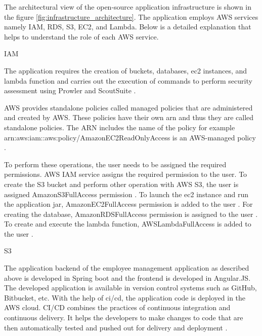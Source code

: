 \par The architectural view of the open-source
application infrastructure is shown in the figure
\ref{fig:infrastructure_architecture}.
The application employs AWS services namely IAM, RDS, S3, EC2, and Lambda.
Below is a detailed explanation that helps to understand the role of each AWS service.

\par IAM

\par The application requires the creation of buckets, databases, ec2 instances, and lambda function and carries out the
execution of commands to perform security assessment
using Prowler and ScoutSuite \cite{79}.

\par AWS provides standalone policies called managed
policies that are administered and created by AWS. These
policies have their own  \gls{arn} and thus they are called
standalone policies.
The ARN includes the name of the policy for example
arn:aws:iam::aws:policy/AmazonEC2ReadOnlyAccess is an AWS-managed policy \cite{80}.

\par To perform these operations, the user needs to be assigned the required permissions.
AWS IAM service assigns the required permission to the user.
To create the S3 bucket and perform other operation with AWS S3, the user is assigned AmazonS3FullAccess permission \cite{81}.
To launch the ec2 instance and run the application jar, AmazonEC2FullAccess permission is added to the user \cite{82}.
For creating the database, AmazonRDSFullAccess permission is assigned to the user \cite{83}.
To create and execute the lambda function, AWSLambdaFullAccess is added to the user \cite{84}.
\hfill \break



\hfill \break

\par S3

\par The application backend of the employee management application as described above is developed in Spring boot and the frontend is developed in Angular.JS. The developed application is available in version control systems such as GitHub, Bitbucket, etc.
With the help of \gls{ci}/\gls{cd}, the application code is
deployed
in the AWS cloud.
CI/CD combines the practices of continuous integration and continuous delivery.
It helps the developers to make changes to code that are
then automatically tested and pushed out for delivery and
deployment \cite{85}.

